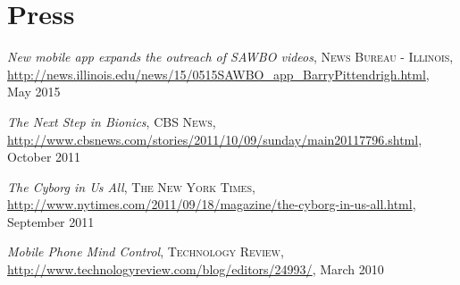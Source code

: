 \section{\sc Press}
\emph{New mobile app expands the outreach of SAWBO videos}, \textsc{News Bureau - Illinois},
\url{http://news.illinois.edu/news/15/0515SAWBO_app_BarryPittendrigh.html},
May 2015
\vspace*{-2.5mm}

\emph{The Next Step in Bionics}, \textsc{CBS News},
\url{http://www.cbsnews.com/stories/2011/10/09/sunday/main20117796.shtml},
October 2011
\vspace*{-2.5mm}

\emph{The Cyborg in Us All}, \textsc{The New York Times},
\url{http://www.nytimes.com/2011/09/18/magazine/the-cyborg-in-us-all.html},
September 2011
\vspace*{-2.5mm}

\emph{Mobile Phone Mind Control}, \textsc{Technology Review},
\url{http://www.technologyreview.com/blog/editors/24993/}, March 2010
\vspace*{-2.5mm}
